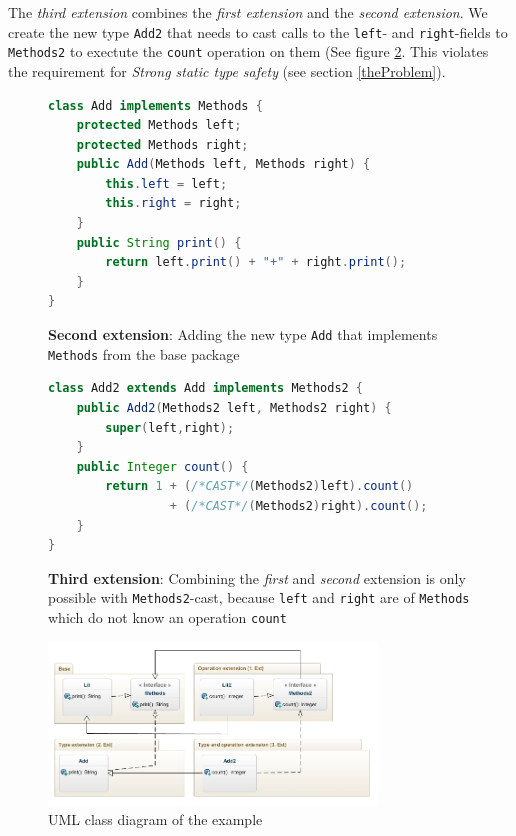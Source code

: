 \documentclass{report}
\begin{document}
The \emph{third extension} combines the \emph{first extension} and the \emph{second extension}. We create the new type \lstinline{Add2} that needs to cast calls to the \lstinline{left}- and \lstinline{right}-fields to \lstinline{Methods2} to exectute the \lstinline{count} operation on them (See figure \ref{exampleThirdExtension}. This violates the requirement for \emph{Strong static type safety} (see section \ref{theProblem}).

\begin{figure}[H]
\begin{lstlisting}[language=java]
class Add implements Methods {
    protected Methods left;
    protected Methods right;
    public Add(Methods left, Methods right) {
        this.left = left;
        this.right = right;
    }
    public String print() {
        return left.print() + "+" + right.print();
    }
}
\end{lstlisting}
\caption{\textbf{Second extension}: Adding the new type \lstinline{Add} that implements \lstinline{Methods} from the base package}
\label{exampleSecondExtension}
\end{figure}
\begin{figure}[H]
\begin{lstlisting}[language=java,commentstyle=\color{red}]
class Add2 extends Add implements Methods2 {
    public Add2(Methods2 left, Methods2 right) {
        super(left,right);
    }
    public Integer count() {
        return 1 + (/*CAST*/(Methods2)left).count() 
                 + (/*CAST*/(Methods2)right).count();
    }
}
\end{lstlisting}
\caption{\textbf{Third extension}: Combining the \emph{first} and \emph{second} extension is only possible with \lstinline{Methods2}-cast, because \lstinline{left} and \lstinline{right} are of \lstinline{Methods} which do not know an operation \lstinline{count}}
\label{exampleThirdExtension}
\end{figure}

\begin{figure}[H]

\includegraphics[width=330px,keepaspectratio=true]{Expression_problem-diag.jpg}

\caption{UML class diagram of the example}
\label{exampleClassDiagram}
\end{figure}
\end{document}
